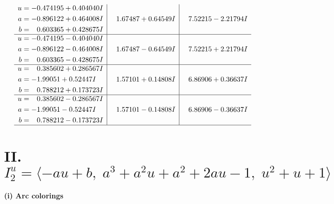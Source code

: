 \documentclass[1p]{elsarticle_modified}
\theoremstyle{definition}
\begin{document}
$$\begin{array}{c|c|c}
\begin{aligned}
u &= -0.474195 + 0.404040 I \\
a &= -0.896122 + 0.464008 I \\
b &= \phantom{-}0.603365 + 0.428675 I\end{aligned}
 & \phantom{-}1.67487 + 0.64549 I & \phantom{-}7.52215 - 2.21794 I \\ \hline\begin{aligned}
u &= -0.474195 - 0.404040 I \\
a &= -0.896122 - 0.464008 I \\
b &= \phantom{-}0.603365 - 0.428675 I\end{aligned}
 & \phantom{-}1.67487 - 0.64549 I & \phantom{-}7.52215 + 2.21794 I \\ \hline\begin{aligned}
u &= \phantom{-}0.385602 + 0.286567 I \\
a &= -1.99051 + 0.52447 I \\
b &= \phantom{-}0.788212 + 0.173723 I\end{aligned}
 & \phantom{-}1.57101 + 0.14808 I & \phantom{-}6.86906 + 0.36637 I \\ \hline\begin{aligned}
u &= \phantom{-}0.385602 - 0.286567 I \\
a &= -1.99051 - 0.52447 I \\
b &= \phantom{-}0.788212 - 0.173723 I\end{aligned}
 & \phantom{-}1.57101 - 0.14808 I & \phantom{-}6.86906 - 0.36637 I\\
 \hline 
 \end{array}$$\newpage\newpage\renewcommand{\arraystretch}{1}
\centering \section*{II. $I^u_{2}= \langle - a u+b,\;a^3+a^2 u+a^2+2 a u-1,\;u^2+u+1 \rangle$}
\flushleft \textbf{(i) Arc colorings}\\
\end{document}
